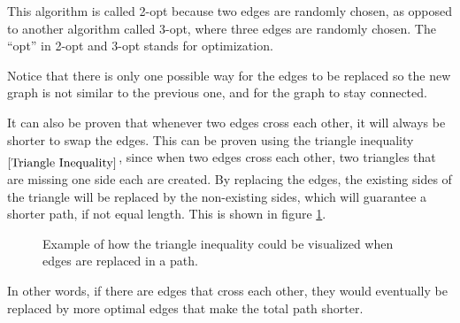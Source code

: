 \documentclass{article}
\begin{document}
\noindent
This algorithm is called 2-opt because two edges are randomly chosen, as opposed to another algorithm called 3-opt, where three edges are randomly chosen. The ``opt'' in 2-opt and 3-opt stands for optimization. 

\noindent
Notice that there is only one possible way for the edges to be replaced so the new graph is not similar to the previous one, and for the graph to stay connected.


\noindent
It can also be proven that whenever two edges cross each other, it will always be shorter to swap the edges. This can be proven using the triangle inequality$_{\ref{Triangle Inequality}}$, since when two edges cross each other, two triangles that are missing one side each are created. By replacing the edges, the existing sides of the triangle will be replaced by the non-existing sides, which will guarantee a shorter path, if not equal length. This is shown in figure \ref{Figure:triangleIneq2opt}.

\begin{figure}[ht]
     \centering
     \caption{Example of how the triangle inequality could be visualized when edges are replaced in a path.}
     \label{Figure:triangleIneq2opt}
\end{figure}

\noindent
In other words, if there are edges that cross each other, they would eventually be replaced by more optimal edges that make the total path shorter.
\end{document}
